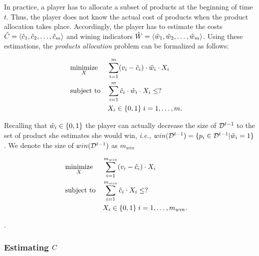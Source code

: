 In practice, a player has to allocate a subset of products at the beginning of time $t$. Thus, the player does not know the actual cost of products when the product allocation takes place. Accordingly, the player has to estimate the costs $\hat{C} = \langle \hat{c}_1, \hat{c}_2, \dots, \hat{c}_m\rangle$ and wining indicators $\hat{W} = \langle \hat{w}_1, \hat{w}_2, \dots, \hat{w}_m\rangle$. Using these estimations, the \emph{products allocation} problem can be formalized as follows:

\begin{equation*}
\begin{aligned}
& \underset{X}{\text{minimize}} & & \sum_{i=1}^{m} (v_{i} - \hat{c}_{i})\cdot\hat{w}_{i}\cdot X_{i} \\
& \text{subject to} & & \sum_{i=1}^{m} \hat{c}_{i}\cdot\hat{w}_{i}\cdot X_{i} \leq ? \\
& & & X_{i} \in \{0,1\} \; i = 1, \ldots, m. & 
\end{aligned}
\end{equation*}

\noindent Recalling that $\hat{w}_{i}\in \{0,1\}$ the player can actually decrease the size of $\mathcal{D}^{t-1}$ to the set of product she estimates she would win, \emph{i.e.,} $win(\mathcal{D}^{t-1}) = \{p_{i}\in \mathcal{D}^{t-1} | \hat{w}_{i} = 1\}$. We denote the size of $win(\mathcal{D}^{t-1})$ as $m_{win}$  

\begin{equation*}
\begin{aligned}
& \underset{X}{\text{minimize}} & & \sum_{i=1}^{m_{win}} (v_{i} - \hat{c}_{i})\cdot X_{i} \\
& \text{subject to} & & \sum_{i=1}^{m_{win}} \hat{c}_{i}\cdot X_{i} \leq ? \\
& & & X_{i} \in \{0,1\} \; i = 1, \ldots, m_{win}. & 
\end{aligned}
\end{equation*}

.

\subsubsection{Estimating $C$}
